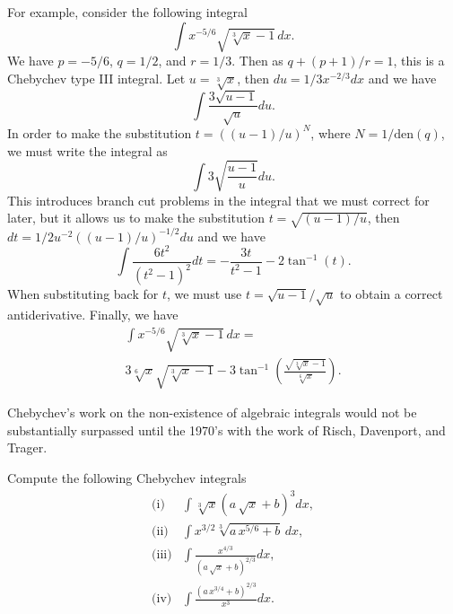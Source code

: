 For example, consider the following integral 
$$\int x^{-5/6}\sqrt{\sqrt[3]{x} - 1}\, dx.$$
We have $p = -5/6$, $q = 1/2$, and $r = 1/3$. Then as $q + (p + 1)/r = 1$, this is a Chebychev type III integral. Let $u = \sqrt[3]{x}$, then $du = 1/3 x^{-2/3} dx$ and we have 
$$\int \frac{3\sqrt{u-1}}{\sqrt{u}}du.$$
In order to make the substitution $t = \left((u-1)/u\right)^N$, where $N = 1/\text{den}(q)$, we must write the integral as 
$$\int 3\sqrt{\frac{u-1}{u}}du.$$
This introduces branch cut problems in the integral that we must correct for later, but it allows us to make the substitution $t = \sqrt{(u-1)/u}$, then $dt = 1/2 u^{-2} ((u-1)/u)^{-1/2} du$ and we have 
$$\int \frac{6t^2}{\left(t^2-1\right)^2}dt = -\frac{3t}{t^2-1} - 2 \tan^{-1}(t).$$
When substituting back for $t$, we must use $t = \sqrt{u-1}/\sqrt{u}$ to obtain a correct antiderivative. Finally, we have 
\begin{multline*}
\int x^{-5/6}\sqrt{\sqrt[3]{x} - 1}\, dx =\\ 
3 \sqrt[6]{x}\sqrt{\sqrt[3]{x} - 1} - 3 \tan^{-1}\left(\frac{\sqrt{\sqrt[3]{x} - 1}}{\sqrt[6]{x}}\right).
\end{multline*}


\bigskip

Chebychev's work on the non-existence of algebraic integrals would not be substantially surpassed until the 1970's with the work of Risch\cite{risch1969}\cite{risch1969}, Davenport\cite{davenport1979}, and Trager\cite{trager1984}. \\

\medskip

Compute the following Chebychev integrals
\allowdisplaybreaks
\begin{align*}
\text{(i)} & \int \sqrt[3]{x} \left(a\, \sqrt{x}+b\right)^3 dx, \\
\text{(ii)} & \int x^{3/2} \sqrt[3]{a\, x^{5/6}+b} \,dx, \\
\text{(iii)} & \int \frac{x^{4/3}}{\left(a\, \sqrt{x}+b\right)^{2/3}} dx, \\
\text{(iv)} & \int \frac{\left(a\, x^{3/4}+b\right)^{2/3}}{x^3} dx.
\end{align*}

\medskip

